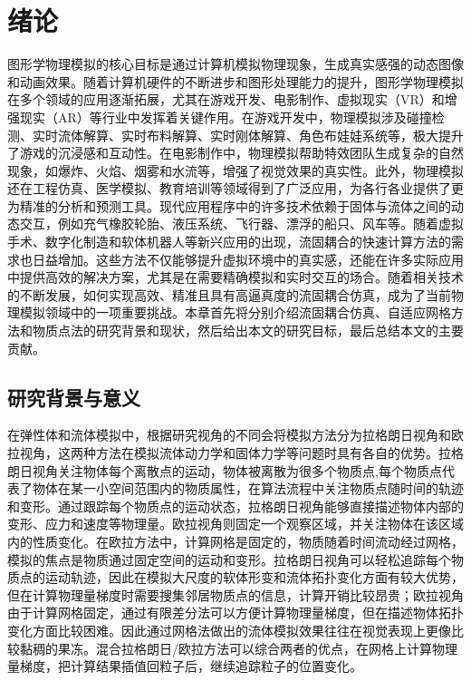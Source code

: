 \chapter{绪论} \label{chap:introduction}
图形学物理模拟的核心目标是通过计算机模拟物理现象，生成真实感强的动态图像和动画效果。随着计算机硬件的不断进步和图形处理能力的提升，图形学物理模拟在多个领域的应用逐渐拓展，尤其在游戏开发、电影制作、虚拟现实（VR）和增强现实（AR）等行业中发挥着关键作用。在游戏开发中，物理模拟涉及碰撞检测、实时流体解算、实时布料解算、实时刚体解算、角色布娃娃系统等，极大提升了游戏的沉浸感和互动性。在电影制作中，物理模拟帮助特效团队生成复杂的自然现象，如爆炸、火焰、烟雾和水流等，增强了视觉效果的真实性。此外，物理模拟还在工程仿真、医学模拟、教育培训等领域得到了广泛应用，为各行各业提供了更为精准的分析和预测工具。现代应用程序中的许多技术依赖于固体与流体之间的动态交互，例如充气橡胶轮胎、液压系统、飞行器、漂浮的船只、风车等。随着虚拟手术、数字化制造和软体机器人等新兴应用的出现，流固耦合的快速计算方法的需求也日益增加。这些方法不仅能够提升虚拟环境中的真实感，还能在许多实际应用中提供高效的解决方案，尤其是在需要精确模拟和实时交互的场合。随着相关技术的不断发展，如何实现高效、精准且具有高逼真度的流固耦合仿真，成为了当前物理模拟领域中的一项重要挑战。本章首先将分别介绍流固耦合仿真、自适应网格方法和物质点法的研究背景和现状，然后给出本文的研究目标，最后总结本文的主要贡献。

\section{研究背景与意义}\label{sect:intro:bg}
在弹性体和流体模拟中，根据研究视角的不同会将模拟方法分为拉格朗日视角和欧拉视角，这两种方法在模拟流体动力学和固体力学等问题时具有各自的优势。拉格朗日视角关注物体每个离散点的运动，物体被离散为很多个物质点,每个物质点代表了物体在某一小空间范围内的物质属性，在算法流程中关注物质点随时间的轨迹和变形。通过跟踪每个物质点的运动状态，拉格朗日视角能够直接描述物体内部的变形、应力和速度等物理量。欧拉视角则固定一个观察区域，并关注物体在该区域内的性质变化。在欧拉方法中，计算网格是固定的，物质随着时间流动经过网格，模拟的焦点是物质通过固定空间的运动和变形。拉格朗日视角可以轻松追踪每个物质点的运动轨迹，因此在模拟大尺度的软体形变和流体拓扑变化方面有较大优势，但在计算物理量梯度时需要搜集邻居物质点的信息，计算开销比较昂贵；欧拉视角由于计算网格固定，通过有限差分法可以方便计算物理量梯度，但在描述物体拓扑变化方面比较困难。因此通过网格法做出的流体模拟效果往往在视觉表现上更像比较黏稠的果冻。混合拉格朗日/欧拉方法可以综合两者的优点，在网格上计算物理量梯度，把计算结果插值回粒子后，继续追踪粒子的位置变化。

